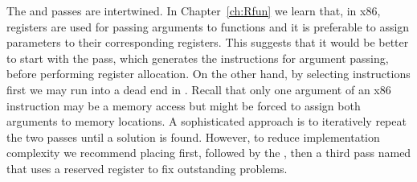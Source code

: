 \documentclass[7x10]{TimesAPriori_MIT}%
\begin{document}
The  and  passes are
intertwined.
%
In Chapter~\ref{ch:Rfun} we learn that, in x86, registers are used for
passing arguments to functions and it is preferable to assign
parameters to their corresponding registers.  This suggests that it
would be better to start with the  pass,
which generates the instructions for argument passing, before
performing register allocation.
%
On the other hand, by selecting instructions first we may run into a
dead end in . Recall that only one argument of an
x86 instruction may be a memory access but  might
be forced to assign both arguments to memory locations.
%
A sophisticated approach is to iteratively repeat the two passes until
a solution is found. However, to reduce implementation complexity we
recommend placing  first, followed by the
, then a third pass named 
that uses a reserved register to fix outstanding problems.
\end{document}
